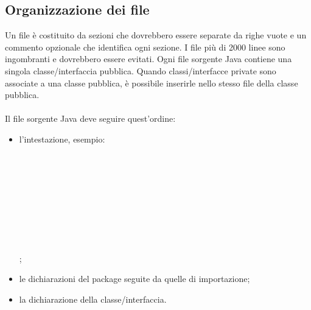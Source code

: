 \subsection{Organizzazione dei file}
Un file \`e costituito da sezioni che dovrebbero essere separate da righe vuote
e un commento opzionale che identifica ogni sezione. I file pi\`u di 2000 linee sono
ingombranti e dovrebbero essere evitati.
Ogni file sorgente Java contiene una singola classe/interfaccia pubblica.
Quando classi/interfacce private sono associate a una classe pubblica,
\`e possibile inserirle nello stesso file della classe pubblica.
\\ \\
Il file sorgente Java deve seguire quest'ordine:
\begin{itemize}
  \item l'intestazione, esempio: \\
  \hspace*{0.5cm} \co{/**} \\
  \hspace*{0.5cm}  \\
  \hspace*{0.5cm} \co{ *} \\
  \hspace*{0.5cm}  \\
  \hspace*{0.5cm} \co{ *} \\
  \hspace*{0.5cm}  \\
  \hspace*{0.5cm} \co{ *} \\
  \hspace*{0.5cm}  \\
  \hspace*{0.5cm} \co{ */} \\
  ;
  \item le dichiarazioni del package seguite da quelle di importazione;
  \item la dichiarazione della classe/interfaccia.
\end{itemize}

